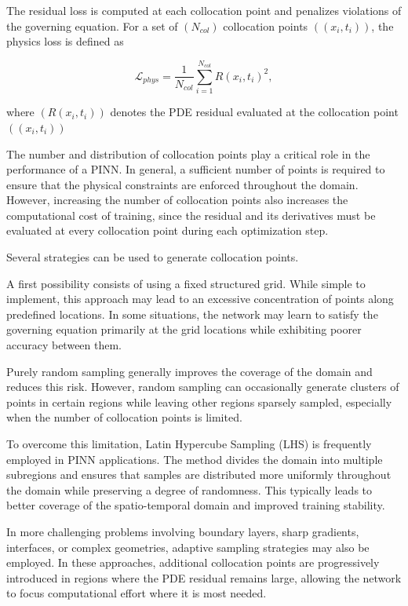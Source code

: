 The residual loss is computed at each collocation point and penalizes violations of the governing equation. For a set of $(N_{col})$ collocation points $((x_i,t_i))$, the physics loss is defined as

\begin{equation}
\mathcal{L}_{phys} = \frac{1}{N_{col}} \sum_{i=1}^{N_{col}} R(x_i,t_i)^2,
\end{equation}

where $(R(x_i,t_i))$ denotes the PDE residual evaluated at the collocation point $((x_i,t_i))$

The number and distribution of collocation points play a critical role in the performance of a PINN. In general, a sufficient number of points is required to ensure that the physical constraints are enforced throughout the domain. However, increasing the number of collocation points also increases the computational cost of training, since the residual and its derivatives must be evaluated at every collocation point during each optimization step.

Several strategies can be used to generate collocation points.

A first possibility consists of using a fixed structured grid. While simple to implement, this approach may lead to an excessive concentration of points along predefined locations. In some situations, the network may learn to satisfy the governing equation primarily at the grid locations while exhibiting poorer accuracy between them.

Purely random sampling generally improves the coverage of the domain and reduces this risk. However, random sampling can occasionally generate clusters of points in certain regions while leaving other regions sparsely sampled, especially when the number of collocation points is limited.

To overcome this limitation, Latin Hypercube Sampling (LHS) is frequently employed in PINN applications. The method divides the domain into multiple subregions and ensures that samples are distributed more uniformly throughout the domain while preserving a degree of randomness. This typically leads to better coverage of the spatio-temporal domain and improved training stability.

In more challenging problems involving boundary layers, sharp gradients, interfaces, or complex geometries, adaptive sampling strategies may also be employed. In these approaches, additional collocation points are progressively introduced in regions where the PDE residual remains large, allowing the network to focus computational effort where it is most needed.

